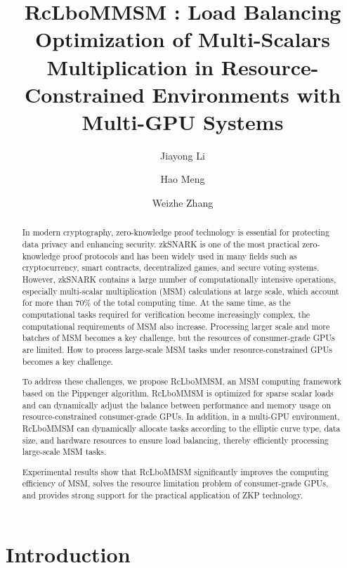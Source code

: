 \documentclass[journal=tches,final]{iacrtrans}
\author{Jiayong Li \and Hao Meng \and Weizhe Zhang}
\institute{
    Harbin Institute of Technology, Harbin, China, \email{sanrenfengna@gamil.com}
}
\title{RcLboMMSM : Load Balancing Optimization of Multi-Scalars Multiplication in Resource-Constrained Environments with Multi-GPU Systems}
\begin{document}
\maketitle


\begin{abstract}

In modern cryptography, zero-knowledge proof technology is essential for protecting data privacy and enhancing security. zkSNARK is one of the most practical zero-knowledge proof protocols and has been widely used in many fields such as cryptocurrency, smart contracts, decentralized games, and secure voting systems. However, zkSNARK contains a large number of computationally intensive operations, especially multi-scalar multiplication (MSM) calculations at large scale, which account for more than 70\% of the total computing time. At the same time, as the computational tasks required for verification become increasingly complex, the computational requirements of MSM also increase. Processing larger scale and more batches of MSM becomes a key challenge, but the resources of consumer-grade GPUs are limited. How to process large-scale MSM tasks under resource-constrained GPUs becomes a key challenge.

To address these challenges, we propose RcLboMMSM, an MSM computing framework based on the Pippenger algorithm. RcLboMMSM is optimized for sparse scalar loads and can dynamically adjust the balance between performance and memory usage on resource-constrained consumer-grade GPUs. In addition, in a multi-GPU environment, RcLboMMSM can dynamically allocate tasks according to the elliptic curve type, data size, and hardware resources to ensure load balancing, thereby efficiently processing large-scale MSM tasks. 
    
Experimental results show that RcLboMMSM significantly improves the computing efficiency of MSM, solves the resource limitation problem of consumer-grade GPUs, and provides strong support for the practical application of ZKP technology.


\end{abstract}

\section{Introduction}
\end{document}

